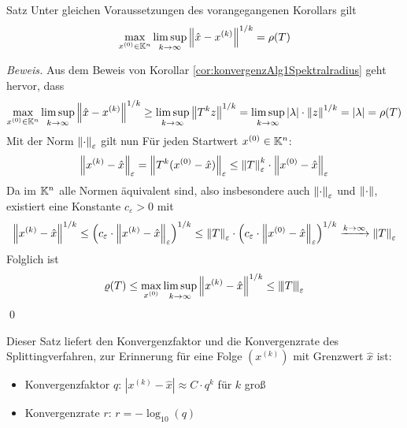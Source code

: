 \begin{colbox}{Satz}
  Unter gleichen Voraussetzungen des vorangegangenen Korollars gilt 
  \begin{align*}
    \max_{x^{(0)}\in\K^n} \limsup_{k\rightarrow \infty} \vertn{2}{\hat{x}-x^{(k)}}^{1/k} = \rho(T)
  \end{align*}
\end{colbox}
\textit{Beweis.}
Aus dem Beweis von Korollar \ref{cor:konvergenzAlg1Spektralradius} geht hervor, dass
%
\begin{align*}
  \max_{x^{(0)}\in\K^n} \limsup_{k\rightarrow \infty} \vertn{2}{\hat{x}-x^{(k)}}^{1/k}
  \geq\limsup_{k\rightarrow\infty} \vertn{2}{T^kz}^{1/k}
  = \limsup_{k\rightarrow\infty}|\lambda|\cdot\vertn{2}{z}^{1/k}
  = |\lambda|=\rho(T)
\end{align*}
%
Mit der Norm $\vertn{2}{\cdot}_\varepsilon$ gilt nun Für jeden Startwert $x^{(0)}\in\mathbb K^n$: 
%
\begin{align*}
  \vertn{2}{x^{(k)}-\hat{x}}_\varepsilon 
  = \vertn{2}{T^k(x^{(0)}-\hat{x})}_\varepsilon
  \leq \vertn{2}{T}_\varepsilon^k\cdot \vertn{2}{x^{(0)}-\hat{x}}_\varepsilon
\end{align*}
%
Da im $\mathbb K^n$ alle Normen äquivalent sind, also insbesondere auch $\vertn{2}{\cdot}_\varepsilon$ 
und $\vertn{2}{\cdot}$, existiert eine Konstante $c_\varepsilon>0$ mit
%
\begin{align*}
  \vertn{2}{x^{(k)}-\hat{x}}^{1/k}
  \leq \left(c_\varepsilon\cdot\vertn{2}{x^{(k)}-\hat{x}}_\varepsilon\right)^{1/k}
  \leq \vertn{2}{T}_\varepsilon \cdot \left(c_\varepsilon\cdot\vertn{2}{x^{(0)}-\hat{x}}_\varepsilon\right)^{1/k}
  \xrightarrow{k\rightarrow\infty} 
  \vertn{2}{T}_\varepsilon
\end{align*}
%
Folglich ist 
%
\begin{align*}
  \varrho(T) 
  \leq \max_{x^{(0)}} \limsup_{k\rightarrow \infty} \vertn{2}{x^{(k)}-\hat{x}}^{1/k}
  \leq \vertn{3}{T}_\varepsilon
\end{align*}
%
\qed

Dieser Satz liefert den Konvergenzfaktor und die Konvergenzrate des Splittingverfahren, zur Erinnerung für eine Folge 
$(x^{(k)})$ mit Grenzwert $\hat{x}$ ist:
\begin{itemize}
  \item Konvergenzfaktor $q$: $ |x^{(k)} - \hat{x}| \approx C\cdot q^k $ für $k$ groß
  \item Konvergenzrate $r$: $r=-\log_{10}(q)$
\end{itemize}

